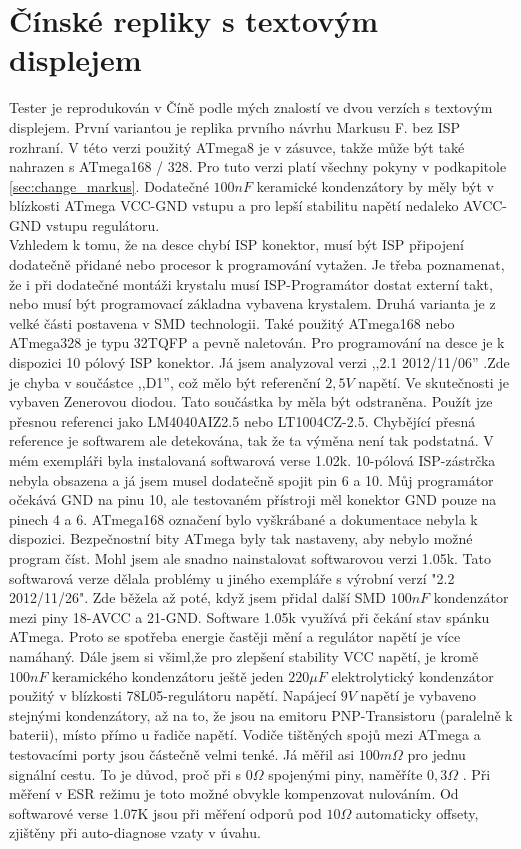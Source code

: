 \section{Čínské repliky s textovým displejem}
Tester je reprodukován v Číně podle mých znalostí ve dvou verzích s textovým displejem.
První variantou je replika prvního návrhu Markusu F. bez ISP rozhraní.
V této verzi použitý ATmega8 je  v zásuvce, takže může být také nahrazen s ATmega168 / 328.
Pro tuto verzi platí všechny pokyny v podkapitole \ref{sec:change_markus}.
Dodatečné \(100nF\) keramické kondenzátory by měly být v blízkosti ATmega VCC-GND vstupu a
pro lepší stabilitu napětí nedaleko AVCC-GND vstupu regulátoru.\\
Vzhledem k tomu, že na desce chybí ISP konektor, musí být ISP připojení dodatečně přidané nebo
procesor k programování vytažen.
Je třeba poznamenat, že i při dodatečné montáži krystalu musí ISP-Programátor dostat externí takt,
nebo musí být programovací základna vybavena krystalem.
Druhá varianta je z velké části postavena v SMD technologii. Také použitý ATmega168 nebo ATmega328
je typu 32TQFP a pevně naletován.
Pro programování na desce je k dispozici 10 pólový ISP konektor.
Já  jsem analyzoval verzi ,,2.1 2012/11/06'' .Zde je chyba v součástce ,,D1'',
což mělo být referenční \(2,5V\) napětí. Ve skutečnosti je vybaven Zenerovou diodou.
Tato součástka by měla být odstraněna. Použít jze přesnou referenci jako LM4040AIZ2.5 nebo
LT1004CZ-2.5. Chybějící přesná reference je softwarem ale detekována, tak že ta výměna
není tak podstatná.
V mém exempláři byla instalovaná softwarová verse 1.02k. 10-pólová ISP-zástrčka nebyla obsazena
a já jsem  musel dodatečně spojit pin 6 a 10. Můj programátor očekává GND na pinu 10, ale
testovaném přístroji měl konektor GND pouze na pinech 4 a 6.
ATmega168 označení bylo vyškrábané a dokumentace nebyla k dispozici.
Bezpečnostní bity ATmega byly tak nastaveny, aby nebylo možné program číst.
Mohl jsem ale snadno nainstalovat softwarovou verzi 1.05k.
Tato softwarová verze dělala problémy u jiného exempláře s výrobní verzí "2.2 2012/11/26".
Zde běžela až poté, když jsem přidal další SMD \(100nF\) kondenzátor mezi piny 18-AVCC
a 21-GND. Software 1.05k využívá při čekání stav spánku ATmega.
Proto se spotřeba energie častěji mění a regulátor napětí je více namáhaný.
Dále jsem si všiml,že pro zlepšení stability VCC napětí, je kromě \(100nF\) keramického kondenzátoru
ještě jeden \(220\mu F\) elektrolytický kondenzátor použitý v blízkosti 78L05-regulátoru napětí.
Napájecí \(9V\) napětí je vybaveno stejnými kondenzátory, až na to, že jsou na emitoru PNP-Transistoru
(paralelně k baterii), místo přímo u řadiče napětí.
Vodiče tištěných spojů mezi ATmega a testovacími porty jsou částečně velmi tenké. Já měřil asi \(100m\Omega\)
pro jednu signální cestu. To je důvod, proč při s \(0\Omega\) spojenými piny, naměříte \(0,3\Omega\) .
Při měření v ESR režimu je toto možné obvykle kompenzovat nulováním.
Od softwarové verse 1.07K jsou při měření odporů pod \(10\Omega\) automaticky offsety, zjištěny při
auto-diagnose vzaty v úvahu.

